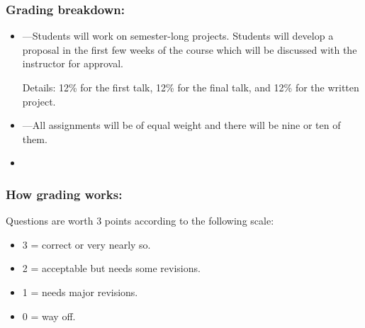 \begin{frame}
  \frametitle{Grading breakdown:}

  \begin{block}{}
    \begin{itemize}
    \item 
      ---Students will 
      work on semester-long projects.  Students will develop a
      proposal in the first few weeks of the course which will be discussed
      with the instructor for approval.  

      \smallskip

      Details: 12\% for the first talk, 12\% for the final talk,
      and 12\% for the written project.
    \end{itemize}
  \end{block}
  \begin{block}{}
    \begin{itemize}
    \item 
      ---All assignments will be 
      of equal weight and there will be nine or ten of them.
    \end{itemize}
  \end{block}
  \begin{block}{}
    \begin{itemize}
    \item 
    \end{itemize}
  \end{block}

\end{frame}

\begin{frame}
  \frametitle{How grading works:}

  \begin{block}{Questions are worth 3 points according to the following scale:}
    \begin{itemize}
    \item 
      3 = correct or very nearly so.
    \item 
      2 = acceptable but needs some revisions.
    \item 
      1 = needs major revisions.
    \item 
      0 = way off.
    \end{itemize}

  \end{block}


\end{frame}


